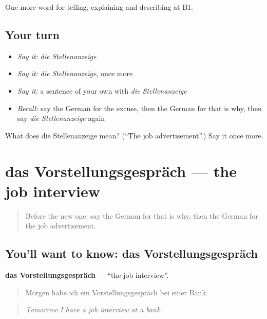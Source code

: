 \begin{grammarlens}[title={What you've built}]
One more word for telling, explaining and describing at B1.
\end{grammarlens}

\subsection*{Your turn}
\begin{itemize}
\raggedright
  \item \emph{Say it:} \emph{die Stellenanzeige}
  \item \emph{Say it:} \emph{die Stellenanzeige}, once more
  \item \emph{Say it:} a sentence of your own with \emph{die Stellenanzeige}
  \item \emph{Recall:} say the German for the excuse, then the German for that is why, then say \emph{die Stellenanzeige} again
\end{itemize}

\begin{tcolorbox}[breakable,colback=teal!4,colframe=teal!35!black,title={Before you move on}]
What does die Stellenanzeige mean? (\textquotedblleft{}The job advertisement\textquotedblright{}.) Say it once more.
\end{tcolorbox}
\section[das Vorstellungsgespräch]{das Vorstellungsgespräch — the job interview}

\label{lesson:GE-C349-vorstellungsgespraech}



\begin{quote}
Before the new one: say the German for that is why, then the German for the job advertisement.
\end{quote}

\subsection*{You'll want to know: das Vorstellungsgespräch}
\textbf{das Vorstellungsgespräch} — \textquotedblleft{}the job interview\textquotedblright{}.

\begin{quote}
Morgen habe ich ein Vorstellungsgespräch bei einer Bank.
\end{quote}

\begin{quote}
\emph{Tomorrow I have a job interview at a bank.}
\end{quote}

